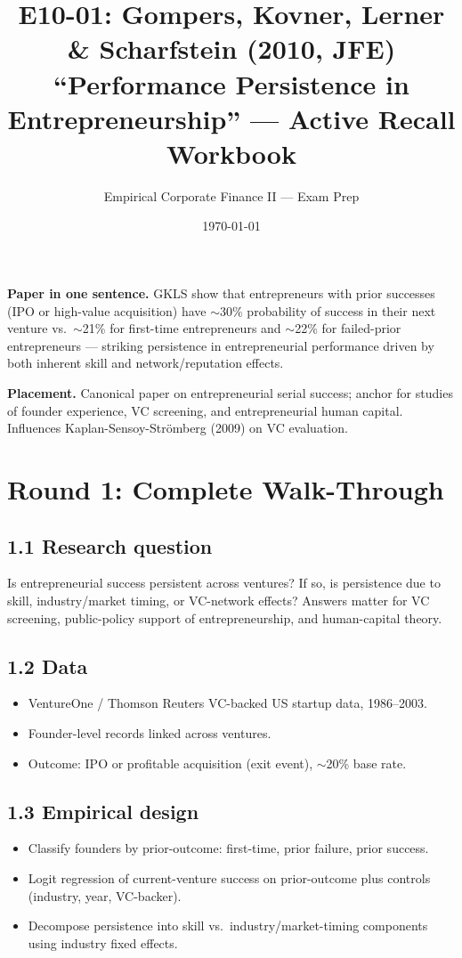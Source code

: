 \documentclass[11pt]{article}
\title{E10-01: Gompers, Kovner, Lerner \& Scharfstein (2010, JFE) \\
\large ``Performance Persistence in Entrepreneurship'' --- Active Recall Workbook}
\author{Empirical Corporate Finance II --- Exam Prep}
\date{\today}
\begin{document}
\maketitle

\begin{keybox}
\textbf{Paper in one sentence.} GKLS show that entrepreneurs with prior successes (IPO or high-value acquisition) have $\sim$30\% probability of success in their next venture vs.\ $\sim$21\% for first-time entrepreneurs and $\sim$22\% for failed-prior entrepreneurs --- striking persistence in entrepreneurial performance driven by both inherent skill and network/reputation effects.

\textbf{Placement.} Canonical paper on entrepreneurial serial success; anchor for studies of founder experience, VC screening, and entrepreneurial human capital. Influences Kaplan-Sensoy-Str\"omberg (2009) on VC evaluation.
\end{keybox}

\section*{Round 1: Complete Walk-Through}

\subsection*{1.1 Research question}
Is entrepreneurial success persistent across ventures? If so, is persistence due to skill, industry/market timing, or VC-network effects? Answers matter for VC screening, public-policy support of entrepreneurship, and human-capital theory.

\subsection*{1.2 Data}
\begin{itemize}
\item VentureOne / Thomson Reuters VC-backed US startup data, 1986--2003.
\item Founder-level records linked across ventures.
\item Outcome: IPO or profitable acquisition (exit event), $\sim$20\% base rate.
\end{itemize}

\subsection*{1.3 Empirical design}
\begin{itemize}
\item Classify founders by prior-outcome: first-time, prior failure, prior success.
\item Logit regression of current-venture success on prior-outcome plus controls (industry, year, VC-backer).
\item Decompose persistence into skill vs.\ industry/market-timing components using industry fixed effects.
\end{itemize}
\end{document}

